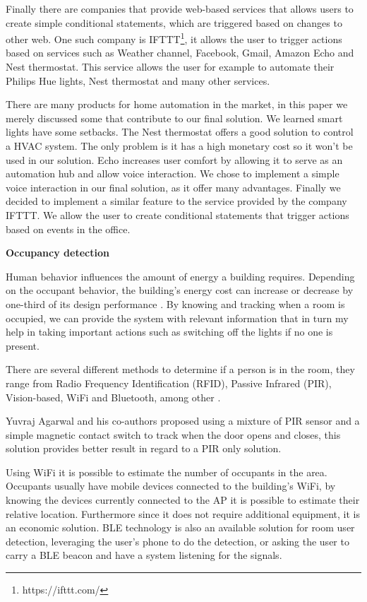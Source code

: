 \documentclass[conference]{IEEEtran}
\begin{document}
Finally there are companies that provide web-based services that allows users to create simple conditional statements, which are triggered based on changes to other web. One such company is IFTTT\footnote{https://ifttt.com/}, it allows the user to trigger actions based on services such as Weather channel, Facebook, Gmail, Amazon Echo and Nest thermostat. This service allows the user for example to automate their Philips Hue lights, Nest thermostat and many other services. 


There are many products for home automation in the market, in this paper we merely discussed some that contribute to our final solution. We learned smart lights have some setbacks. The Nest thermostat offers a good solution to control a \ac{HVAC} system. The only problem is it has a high monetary cost so it won't be used in our solution. Echo increases user comfort by allowing it to serve as an automation hub and allow voice interaction. We chose to implement a simple voice interaction in our final solution, as it offer many advantages. Finally we decided to implement a similar feature to the service provided by the company IFTTT. We allow the user to create conditional statements that trigger actions based on events in the office.


\textbf{Occupancy detection}


Human behavior influences the amount of energy a building requires. Depending on the occupant behavior, the building's energy cost can increase or decrease by one-third of its design performance \cite{ocupancy2}. 
By knowing and tracking when a room is occupied, we can provide the system with relevant information that in turn my help in taking important actions such as switching off the lights if no one is present. 

There are several different methods to determine if a person is in the room, they range from Radio Frequency Identification (RFID), Passive Infrared (PIR), Vision-based, \ac{WiFi} and Bluetooth, among other \cite{ocupancy3}.

Yuvraj Agarwal and his co-authors proposed using a mixture of PIR sensor and a simple magnetic contact switch to track when the door opens and closes, this solution provides better result in regard to a PIR only solution\cite{ocupancy1}.

Using \ac{WiFi} it is possible to estimate the number of occupants in the area. Occupants usually have mobile devices connected to the building's \ac{WiFi}, by knowing the devices currently connected to the AP it is possible to estimate their relative location. Furthermore since it does not require additional equipment, it is an economic solution.
\ac{BLE} technology is also an available solution for room user detection, leveraging the user's phone to do the detection, or asking the user to carry a \ac{BLE} beacon and have a system listening for the signals.  
\end{document}
